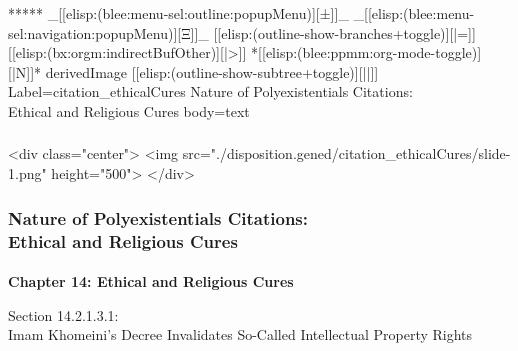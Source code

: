 \begin{whenOrg}
\begin{whenOrg}
*****  _[[elisp:(blee:menu-sel:outline:popupMenu)][±]]_ _[[elisp:(blee:menu-sel:navigation:popupMenu)][Ξ]]_ [[elisp:(outline-show-branches+toggle)][|=]] [[elisp:(bx:orgm:indirectBufOther)][|>]] *[[elisp:(blee:ppmm:org-mode-toggle)][|N]]*  derivedImage [[elisp:(outline-show-subtree+toggle)][||]] Label=citation_ethicalCures Nature of Polyexistentials Citations:\\ Ethical and Religious Cures body=text
\end{whenOrg}

\begin{htmlonly}

\begin{frame}[fragile,plain,label=citation_ethicalCures]
    \frametitle{}
    \framesubtitle{}
    \begin{rawhtml}
<div class="center">
<img src="./disposition.gened/citation_ethicalCures/slide-1.png" height="500">
</div>
    \end{rawhtml}
\end{frame}
\end{htmlonly}

\begin{verblatex}

\begin{frame}[fragile,plain,label=citation_ethicalCures]
    \frametitle{Nature of Polyexistentials Citations:\\ Ethical and Religious Cures}
    \framesubtitle{}


    \begin{center}
      \begin{large}
        \textbf{Chapter 14: Ethical and Religious Cures}
      \end{large}
  \end{center}

    \bigskip

  \begin{large}
Section 14.2.1.3.1:\\[10pt] Imam Khomeini's Decree Invalidates So-Called Intellectual Property Rights
  \end{large}


\end{frame}
\end{verblatex}
\end{whenOrg}
